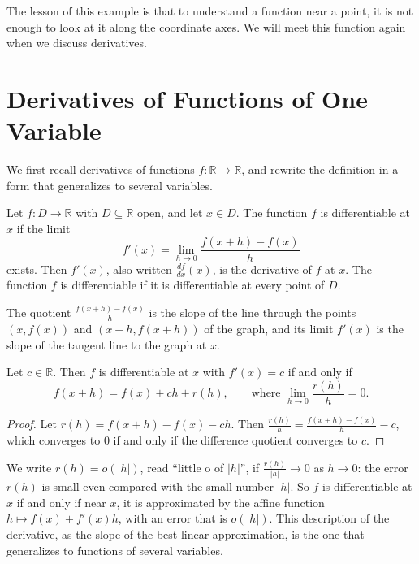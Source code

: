 The lesson of this example is that to understand a function near a point, it is not enough to look at it along the coordinate axes. We will meet this function again when we discuss derivatives.

\section{Derivatives of Functions of One Variable}\label{L3-sec:univariate}

We first recall derivatives of functions $f: \mathbb{R} \to \mathbb{R}$, and rewrite the definition in a form that generalizes to several variables.

\begin{definition}[Derivative]\label{L3-def:derivative}
    Let $f: D \to \mathbb{R}$ with $D \subseteq \mathbb{R}$ open, and let $x \in D$. The function $f$ is differentiable at $x$ if the limit
    \[f'(x) = \lim_{h \to 0} \frac{f(x + h) - f(x)}{h}\]
    exists. Then $f'(x)$, also written $\frac{df}{dx}(x)$, is the derivative of $f$ at $x$. The function $f$ is differentiable if it is differentiable at every point of $D$.
\end{definition}

The quotient $\frac{f(x + h) - f(x)}{h}$ is the slope of the line through the points $(x, f(x))$ and $(x + h, f(x + h))$ of the graph, and its limit $f'(x)$ is the slope of the tangent line to the graph at $x$.

\begin{proposition}\label{L3-prop:linear-approx-1d}
    Let $c \in \mathbb{R}$. Then $f$ is differentiable at $x$ with $f'(x) = c$ if and only if
    \[f(x + h) = f(x) + c h + r(h), \qquad \text{where } \lim_{h \to 0} \frac{r(h)}{h} = 0.\]
\end{proposition}

\begin{proof}
    Let $r(h) = f(x + h) - f(x) - ch$. Then $\frac{r(h)}{h} = \frac{f(x + h) - f(x)}{h} - c$, which converges to $0$ if and only if the difference quotient converges to $c$.
\end{proof}

We write $r(h) = o(|h|)$, read ``little o of $|h|$'', if $\frac{r(h)}{|h|} \to 0$ as $h \to 0$: the error $r(h)$ is small even compared with the small number $|h|$. So $f$ is differentiable at $x$ if and only if near $x$, it is approximated by the affine function $h \mapsto f(x) + f'(x) h$, with an error that is $o(|h|)$. This description of the derivative, as the slope of the best linear approximation, is the one that generalizes to functions of several variables.

